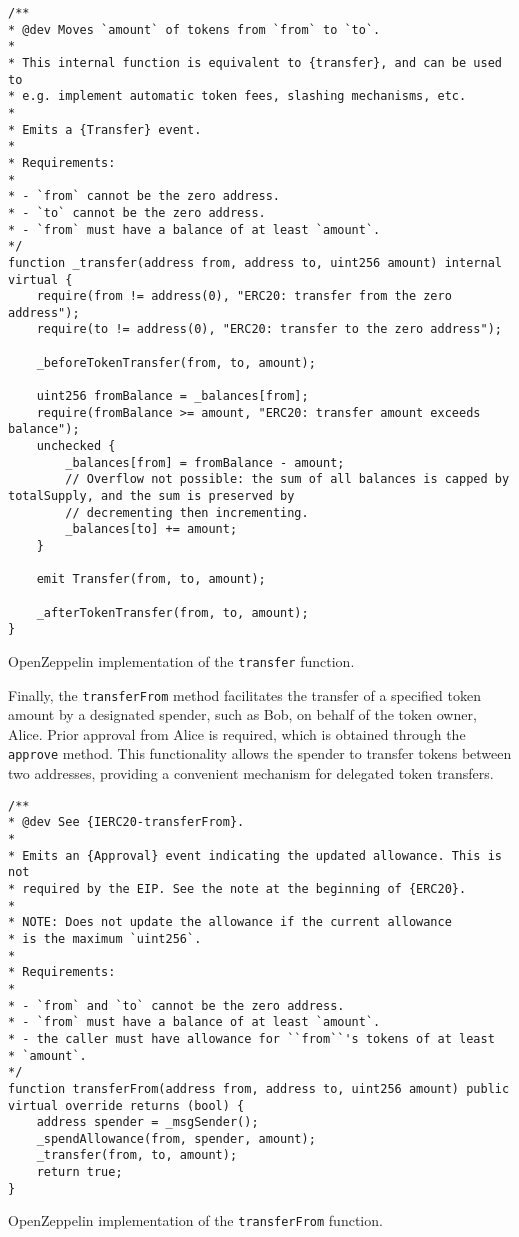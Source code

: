 \begin{listing}[!ht]
    \begin{verbatim}
/**
* @dev Moves `amount` of tokens from `from` to `to`.
*
* This internal function is equivalent to {transfer}, and can be used to
* e.g. implement automatic token fees, slashing mechanisms, etc.
*
* Emits a {Transfer} event.
*
* Requirements:
*
* - `from` cannot be the zero address.
* - `to` cannot be the zero address.
* - `from` must have a balance of at least `amount`.
*/
function _transfer(address from, address to, uint256 amount) internal virtual {
    require(from != address(0), "ERC20: transfer from the zero address");
    require(to != address(0), "ERC20: transfer to the zero address");

    _beforeTokenTransfer(from, to, amount);

    uint256 fromBalance = _balances[from];
    require(fromBalance >= amount, "ERC20: transfer amount exceeds balance");
    unchecked {
        _balances[from] = fromBalance - amount;
        // Overflow not possible: the sum of all balances is capped by totalSupply, and the sum is preserved by
        // decrementing then incrementing.
        _balances[to] += amount;
    }

    emit Transfer(from, to, amount);

    _afterTokenTransfer(from, to, amount);
}
    \end{verbatim}
    \caption{OpenZeppelin implementation of the \texttt{transfer} function.}
    \label{lst:openzeppelin_transfer}
\end{listing}

Finally, the \texttt{transferFrom} method facilitates the transfer of a specified token amount by a designated spender, such as Bob, on behalf of the token owner, Alice. Prior approval 
from Alice is required, which is obtained through the \texttt{approve} method. This functionality allows the spender to transfer tokens between two addresses, providing a convenient 
mechanism for delegated token transfers.

\begin{listing}[!ht]
    \begin{verbatim}
/**
* @dev See {IERC20-transferFrom}.
*
* Emits an {Approval} event indicating the updated allowance. This is not
* required by the EIP. See the note at the beginning of {ERC20}.
*
* NOTE: Does not update the allowance if the current allowance
* is the maximum `uint256`.
*
* Requirements:
*
* - `from` and `to` cannot be the zero address.
* - `from` must have a balance of at least `amount`.
* - the caller must have allowance for ``from``'s tokens of at least
* `amount`.
*/
function transferFrom(address from, address to, uint256 amount) public virtual override returns (bool) {
    address spender = _msgSender();
    _spendAllowance(from, spender, amount);
    _transfer(from, to, amount);
    return true;
}
    \end{verbatim}
    \caption{OpenZeppelin implementation of the \texttt{transferFrom} function.}
    \label{lst:openzeppelin_transferFrom}
\end{listing}

